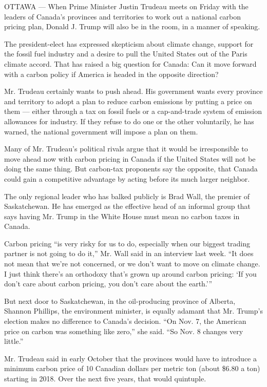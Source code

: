 OTTAWA --- When Prime Minister Justin Trudeau meets on Friday with the
leaders of Canada's provinces and territories to work out a national
carbon pricing plan, Donald J. Trump will also be in the room, in a
manner of speaking.

The president-elect has expressed skepticism about climate change,
support for the fossil fuel industry and a desire to pull the United
States out of the Paris climate accord. That has raised a big question
for Canada: Can it move forward with a carbon policy if America is
headed in the opposite direction?

Mr. Trudeau certainly wants to push ahead. His government wants every
province and territory to adopt a plan to reduce carbon emissions by
putting a price on them --- either through a tax on fossil fuels or a
cap-and-trade system of emission allowances for industry. If they refuse
to do one or the other voluntarily, he has warned, the national
government will impose a plan on them.

Many of Mr. Trudeau's political rivals argue that it would be
irresponsible to move ahead now with carbon pricing in Canada if the
United States will not be doing the same thing. But carbon-tax
proponents say the opposite, that Canada could gain a competitive
advantage by acting before its much larger neighbor.

The only regional leader who has balked publicly is Brad Wall, the
premier of Saskatchewan. He has emerged as the effective head of an
informal group that says having Mr. Trump in the White House must mean
no carbon taxes in Canada.

Carbon pricing ``is very risky for us to do, especially when our biggest
trading partner is not going to do it,'' Mr. Wall said in an interview
last week. ``It does not mean that we're not concerned, or we don't want
to move on climate change. I just think there's an orthodoxy that's
grown up around carbon pricing: `If you don't care about carbon pricing,
you don't care about the earth.'''

But next door to Saskatchewan, in the oil-producing province of Alberta,
Shannon Phillips, the environment minister, is equally adamant that Mr.
Trump's election makes no difference to Canada's decision. ``On Nov. 7,
the American price on carbon was something like zero,'' she said. ``So
Nov. 8 changes very little.''

Mr. Trudeau said in early October that the provinces would have to
introduce a minimum carbon price of 10 Canadian dollars per metric ton
(about \$6.80 a ton) starting in 2018. Over the next five years, that
would quintuple.


